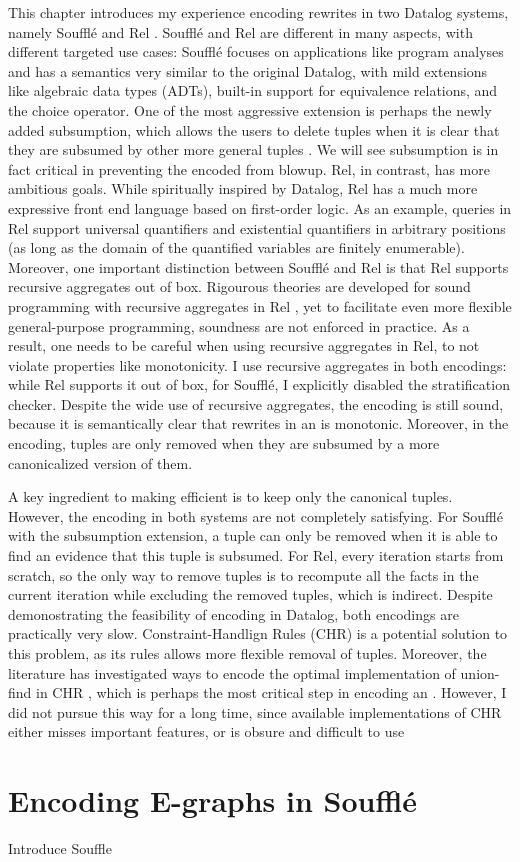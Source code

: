 This chapter introduces my experience encoding \egraph rewrites 
 in two Datalog systems, namely Souffl\'e \citep{souffle} and Rel \citep{rel-doc}.
Souffl\'e and Rel are different in many aspects, with different targeted use cases:
 Souffl\'e focuses on applications like program analyses
 and has a semantics very similar to the original Datalog,
 with mild extensions like algebraic data types (ADTs),
 built-in support for equivalence relations, and the choice operator.
One of the most aggressive extension is perhaps
 the newly added subsumption,
 which allows the users to delete tuples 
 when it is clear that they are subsumed by other more general tuples \citep{datalog-subsumption}.
We will see subsumption is in fact critical in preventing the encoded \egraphs from blowup.
Rel, in contrast, has more ambitious goals.
While spiritually inspired by Datalog, 
 Rel has a much more expressive front end language based on first-order logic.
As an example, 
 queries in Rel support universal quantifiers and existential quantifiers in arbitrary positions
 (as long as the domain of the quantified variables are finitely enumerable).
Moreover,
 one important distinction between Souffl\'e and Rel is
 that Rel supports recursive aggregates out of box.
Rigourous theories are developed 
 for sound programming with recursive aggregates in Rel \citep{datalogo-convergence},
 yet to facilitate even more flexible general-purpose programming,
 soundness are not enforced in practice.
As a result,
 one needs to be careful when using recursive aggregates in Rel,
 to not violate properties like monotonicity.
I use recursive aggregates in both encodings:
 while Rel supports it out of box, 
 for Souffl\'e, I explicitly disabled the stratification checker.
Despite the wide use of recursive aggregates, the encoding is still sound,
 because it is semantically clear that rewrites in an \egraph is monotonic.
Moreover, in the encoding,
 tuples are only removed when they are subsumed by a more canonicalized version of them.

A key ingredient to making \egraph efficient is 
 to keep only the canonical tuples.
However, the encoding in both systems are not completely satisfying.
For Souffl\'e with the subsumption extension,
 a tuple can only be removed when it is able to find an evidence 
 that this tuple is subsumed.
For Rel, every iteration starts from scratch,
 so the only way to remove tuples is 
 to recompute all the facts in the current iteration while excluding the removed tuples,
 which is indirect.
Despite demonostrating the feasibility of encoding \egraphs in Datalog, 
 both encodings are practically very slow.
Constraint-Handlign Rules (CHR) \citep{chr} is a potential solution to this problem,
 as its rules allows more flexible removal of tuples.
Moreover,
 the literature has investigated 
 ways to encode the optimal implementation of union-find in CHR \citep{uf-chr},
 which is perhaps the most critical step in encoding an \egraph.
However, I did not pursue this way for a long time, 
 since available implementations of CHR either misses important features,
 or is obsure and difficult to use

\section{Encoding E-graphs in Souffl\'e}

Introduce Souffle